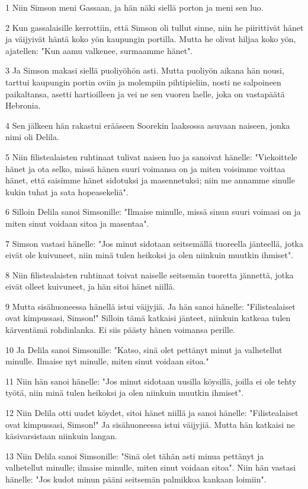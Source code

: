 \par 1 Niin Simson meni Gassaan, ja hän näki siellä porton ja meni sen luo.
\par 2 Kun gassalaisille kerrottiin, että Simson oli tullut sinne, niin he piirittivät hänet ja väijyivät häntä koko yön kaupungin portilla. Mutta he olivat hiljaa koko yön, ajatellen: "Kun aamu valkenee, surmaamme hänet".
\par 3 Ja Simson makasi siellä puoliyöhön asti. Mutta puoliyön aikana hän nousi, tarttui kaupungin portin oviin ja molempiin pihtipieliin, nosti ne salpoineen paikaltansa, asetti hartioilleen ja vei ne sen vuoren laelle, joka on vastapäätä Hebronia.
\par 4 Sen jälkeen hän rakastui erääseen Soorekin laaksossa asuvaan naiseen, jonka nimi oli Delila.
\par 5 Niin filistealaisten ruhtinaat tulivat naisen luo ja sanoivat hänelle: "Viekoittele hänet ja ota selko, missä hänen suuri voimansa on ja miten voisimme voittaa hänet, että saisimme hänet sidotuksi ja masennetuksi; niin me annamme sinulle kukin tuhat ja sata hopeasekeliä".
\par 6 Silloin Delila sanoi Simsonille: "Ilmaise minulle, missä sinun suuri voimasi on ja miten sinut voidaan sitoa ja masentaa".
\par 7 Simson vastasi hänelle: "Jos minut sidotaan seitsemällä tuoreella jänteellä, jotka eivät ole kuivuneet, niin minä tulen heikoksi ja olen niinkuin muutkin ihmiset".
\par 8 Niin filistealaisten ruhtinaat toivat naiselle seitsemän tuoretta jännettä, jotka eivät olleet kuivuneet, ja hän sitoi hänet niillä.
\par 9 Mutta sisähuoneessa hänellä istui väijyjiä. Ja hän sanoi hänelle: "Filistealaiset ovat kimpussasi, Simson!" Silloin tämä katkaisi jänteet, niinkuin katkeaa tulen kärventämä rohdinlanka. Ei siis päästy hänen voimansa perille.
\par 10 Ja Delila sanoi Simsonille: "Katso, sinä olet pettänyt minut ja valhetellut minulle. Ilmaise nyt minulle, miten sinut voidaan sitoa."
\par 11 Niin hän sanoi hänelle: "Jos minut sidotaan uusilla köysillä, joilla ei ole tehty työtä, niin minä tulen heikoksi ja olen niinkuin muutkin ihmiset".
\par 12 Niin Delila otti uudet köydet, sitoi hänet niillä ja sanoi hänelle: "Filistealaiset ovat kimpussasi, Simson!" Ja sisähuoneessa istui väijyjiä. Mutta hän katkaisi ne käsivarsistaan niinkuin langan.
\par 13 Niin Delila sanoi Simsonille: "Sinä olet tähän asti minua pettänyt ja valhetellut minulle; ilmaise minulle, miten sinut voidaan sitoa". Niin hän vastasi hänelle: "Jos kudot minun pääni seitsemän palmikkoa kankaan loimiin".
